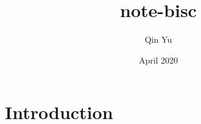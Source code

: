 \documentclass{article}
\title{note-bisc}
\author{Qin Yu}
\date{April 2020}
\begin{document}
\maketitle

\section{Introduction}
\end{document}

